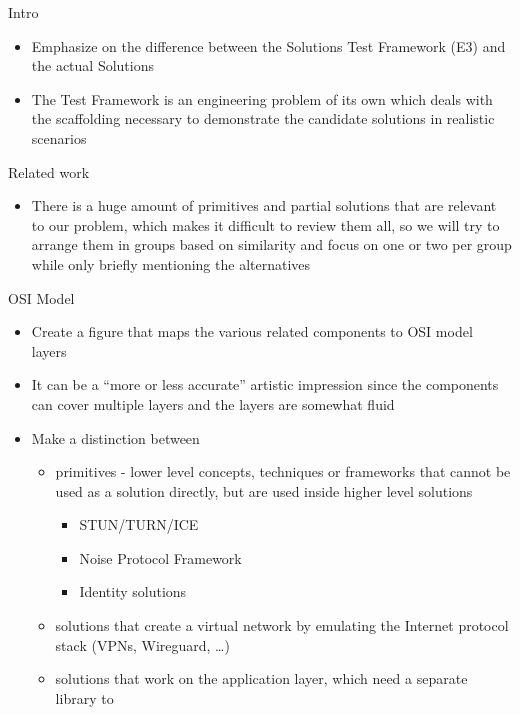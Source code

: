 \begin{frame}{Intro}
\protect\hypertarget{intro}{}
\begin{itemize}
\tightlist
\item
  Emphasize on the difference between the Solutions Test Framework (E3)
  and the actual Solutions
\item
  The Test Framework is an engineering problem of its own which deals
  with the scaffolding necessary to demonstrate the candidate solutions
  in realistic scenarios
\end{itemize}
\end{frame}

\begin{frame}[fragile]{Related work}
\protect\hypertarget{related-work}{}
\begin{itemize}
\tightlist
\item
  There is a huge amount of primitives and partial solutions that are
  relevant to our problem, which makes it difficult to review them all,
  so we will try to arrange them in groups based on similarity and focus
  on one or two per group while only briefly mentioning the alternatives
\end{itemize}

\begin{block}{OSI Model}
\protect\hypertarget{osi-model}{}
\begin{itemize}
\item
  Create a figure that maps the various related components to OSI model
  layers
\item
  It can be a ``more or less accurate'' artistic impression since the
  components can cover multiple layers and the layers are somewhat fluid
\item
  Make a distinction between

  \begin{itemize}
  \tightlist
  \item
    primitives - lower level concepts, techniques or frameworks that
    cannot be used as a solution directly, but are used inside higher
    level solutions

    \begin{itemize}
    \tightlist
    \item
      STUN/TURN/ICE
    \item
      Noise Protocol Framework
    \item
      Identity solutions
    \end{itemize}
  \item
    solutions that create a virtual network by emulating the Internet
    protocol stack (VPNs, Wireguard, \ldots)
  \item
    solutions that work on the application layer, which need a separate
    library to
  \end{itemize}
\end{itemize}
\end{block}


\end{frame}
